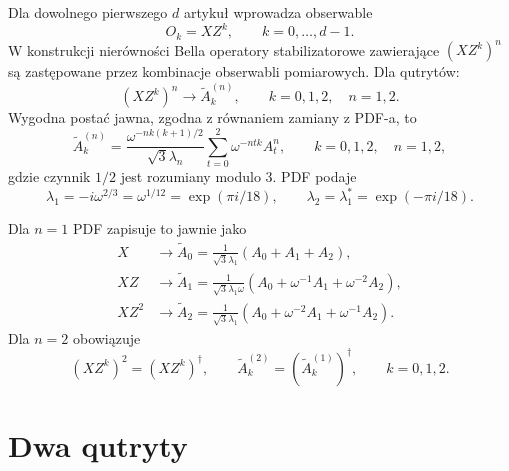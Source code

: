 \documentclass[12pt]{article}
\begin{document}
Dla dowolnego pierwszego $d$ artyku\l{} wprowadza obserwable
\begin{equation}
    O_k=XZ^k,\qquad k=0,\ldots,d-1.
\end{equation}
W konstrukcji nier\'owno\'sci Bella operatory stabilizatorowe zawieraj\k{a}ce
$(XZ^k)^n$ s\k{a} zast\k{e}powane przez kombinacje obserwabli pomiarowych. Dla qutryt\'ow:
\begin{equation}
    (XZ^k)^n \longrightarrow \widetilde{A}^{(n)}_k,
    \qquad k=0,1,2,\quad n=1,2.
\end{equation}
Wygodna posta\'c jawna, zgodna z r\'ownaniem zamiany z PDF-a, to
\begin{equation}
    \widetilde{A}^{(n)}_k
    =
    \frac{\omega^{-n k(k+1)/2}}{\sqrt{3}\lambda_n}
    \sum_{t=0}^{2}\omega^{-ntk}A_t^n,
    \qquad k=0,1,2,\quad n=1,2,
    \label{eq:qutrit-replacement}
\end{equation}
gdzie czynnik $1/2$ jest rozumiany modulo $3$. PDF podaje
\begin{equation}
    \lambda_1=-i\omega^{2/3}=\omega^{1/12}=\exp(\pi i/18),
    \qquad
    \lambda_2=\lambda_1^*=\exp(-\pi i/18).
\end{equation}

Dla $n=1$ PDF zapisuje to jawnie jako
\begin{align}
    X &\longrightarrow \widetilde{A}_0
    =\frac{1}{\sqrt{3}\lambda_1}(A_0+A_1+A_2),\\
    XZ &\longrightarrow \widetilde{A}_1
    =\frac{1}{\sqrt{3}\lambda_1\omega}
    (A_0+\omega^{-1}A_1+\omega^{-2}A_2),\\
    XZ^2 &\longrightarrow \widetilde{A}_2
    =\frac{1}{\sqrt{3}\lambda_1}
    (A_0+\omega^{-2}A_1+\omega^{-1}A_2).
\end{align}
Dla $n=2$ obowi\k{a}zuje
\begin{equation}
    (XZ^k)^2=(XZ^k)^\dagger,
    \qquad
    \widetilde{A}^{(2)}_k=(\widetilde{A}^{(1)}_k)^\dagger,
    \qquad k=0,1,2.
\end{equation}

\section{Dwa qutryty}
\end{document}
